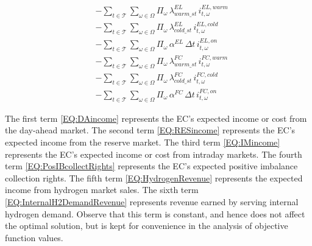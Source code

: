 \documentclass{article}
\begin{document}
\begin{subequations}
\begin{align}
       & - \sum_{t \in \mathcal{T}} \sum_{\omega \in \Omega}
            \Pi_{\omega}\, \lambda_{warm\_st}^{EL}\, i^{EL,warm}_{t,\omega}
            \label{EQ:EL_WarmStartupCost} \\
       & - \sum_{t \in \mathcal{T}} \sum_{\omega \in \Omega}
            \Pi_{\omega}\, \lambda_{cold\_st}^{EL}\, i^{EL,cold}_{t,\omega}
            \label{EQ:EL_ColdStartupCost} \\
       & - \sum_{t \in \mathcal{T}} \sum_{\omega \in \Omega}
            \Pi_{\omega}\, \alpha^{EL}\, \Delta t\, i^{EL,on}_{t,\omega}
            \label{EQ:ELReplCost} \\
       & - \sum_{t \in \mathcal{T}} \sum_{\omega \in \Omega}
            \Pi_{\omega}\, \lambda_{warm\_st}^{FC}\, i^{FC,warm}_{t,\omega}
            \label{EQ:FC_WarmStartupCost} \\
       & - \sum_{t \in \mathcal{T}} \sum_{\omega \in \Omega}
            \Pi_{\omega}\, \lambda_{cold\_st}^{FC}\, i^{FC,cold}_{t,\omega}
            \label{EQ:FC_ColdStartupCost} \\
       & - \sum_{t \in \mathcal{T}} \sum_{\omega \in \Omega}
            \Pi_{\omega}\, \alpha^{FC}\, \Delta t\, i^{FC,on}_{t,\omega}
            \label{EQ:FCReplCost}
\end{align}
\label{EQ:EECSW}
\end{subequations}

The first term \eqref{EQ:DAincome} represents the EC's expected income or cost
from the day-ahead market. The second term \eqref{EQ:RESincome} represents the
EC's expected income from the reserve market. The third term \eqref{EQ:IMincome}
represents the EC's expected income or cost from intraday markets. The fourth
term \eqref{EQ:PosIBcollectRights} represents the EC's expected positive
imbalance collection rights. The fifth term \eqref{EQ:HydrogenRevenue}
represents the expected income from hydrogen market sales. The sixth term
\eqref{EQ:InternalH2DemandRevenue} represents revenue earned by serving
internal hydrogen demand. Observe that this term is constant, and hence does
not affect the optimal solution, but is kept for convenience in the analysis of
objective function values.
\end{document}
